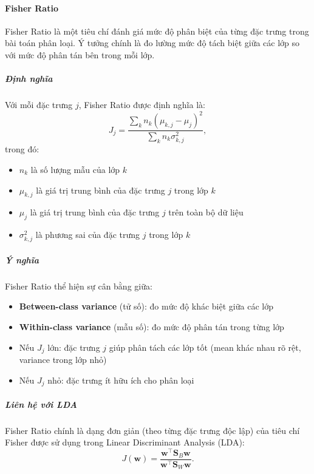 \paragraph{Fisher Ratio}
Fisher Ratio là một tiêu chí đánh giá mức độ phân biệt của từng đặc trưng
trong bài toán phân loại. Ý tưởng chính là đo lường mức độ tách biệt giữa các
lớp so với mức độ phân tán bên trong mỗi lớp.

\subparagraph{Định nghĩa}
Với mỗi đặc trưng $j$, Fisher Ratio được định nghĩa là:
\begin{equation}
  J_j = \frac{\sum\limits_{k} n_k (\mu_{k,j} - \mu_j)^2}
  {\sum\limits_{k} n_k \sigma_{k,j}^2},
\end{equation}
trong đó:
\begin{itemize}
  \item $n_k$ là số lượng mẫu của lớp $k$
  \item $\mu_{k,j}$ là giá trị trung bình của đặc trưng $j$ trong lớp $k$
  \item $\mu_j$ là giá trị trung bình của đặc trưng $j$ trên toàn bộ dữ liệu
  \item $\sigma_{k,j}^2$ là phương sai của đặc trưng $j$ trong lớp $k$
\end{itemize}

\subparagraph{Ý nghĩa}
Fisher Ratio thể hiện sự cân bằng giữa:
\begin{itemize}
  \item \textbf{Between-class variance} (tử số): đo mức độ khác biệt giữa các
  lớp
  \item \textbf{Within-class variance} (mẫu số): đo mức độ phân tán trong từng
  lớp
\end{itemize}

\begin{itemize}
  \item Nếu $J_j$ lớn: đặc trưng $j$ giúp phân tách các lớp tốt (mean khác
  nhau rõ rệt, variance trong lớp nhỏ)
  \item Nếu $J_j$ nhỏ: đặc trưng ít hữu ích cho phân loại
\end{itemize}

\subparagraph{Liên hệ với LDA}

Fisher Ratio chính là dạng đơn giản (theo từng đặc trưng độc lập) của tiêu chí
Fisher được sử dụng trong Linear Discriminant Analysis (LDA):
\begin{equation}
  J(\boldsymbol{w}) = \frac{\boldsymbol{w}^\intercal \boldsymbol{S}_B
  \boldsymbol{w}} {\boldsymbol{w}^\intercal \boldsymbol{S}_W \boldsymbol{w}}.
\end{equation}

